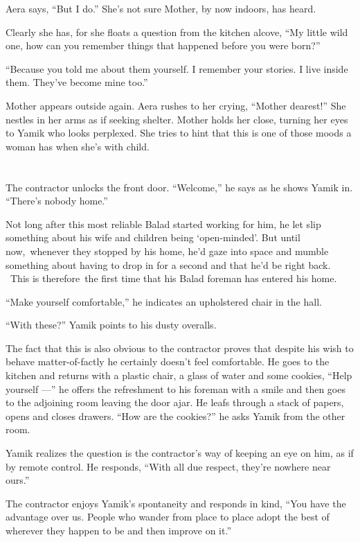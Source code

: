 \documentclass[twoside,11pt,openany]{book}
\begin{document}
Aera says, ``But I do.'' She's not sure Mother, by now indoors, has heard.

Clearly she has, for she floats a question from the kitchen alcove, ``My little wild one, how can you
remember things that happened before you were born?''

``Because you told me about them yourself. I remember your stories. I live inside them. They've become mine
too.''

Mother appears outside again. Aera rushes to her crying, ``Mother dearest!'' She nestles in
her arms as if seeking shelter. Mother holds her close, turning her eyes to Yamik who looks perplexed. She tries to hint
that this is one of those moods a woman has when she's with child.



\chapter{}

The contractor unlocks the front door. ``Welcome,'' he says as he shows Yamik in.
``There's nobody home.''

Not long after this most reliable Balad started working for him, he let slip something about his wife and children
being `open-minded{}'. But until now,~whenever they stopped by his home, he'd gaze into space and mumble something
about having to drop in for a second and that he'd be right back. ~This is therefore~the first time that his Balad
foreman has entered his home.

``Make yourself comfortable,'' he indicates an upholstered chair in the hall.

``With these?'' Yamik points to his dusty overalls.

The fact that this is also obvious to the contractor proves that despite his wish to behave matter-of-factly he certainly
doesn't feel comfortable. He goes to the kitchen and returns with a plastic chair, a glass of water and some cookies,
``Help yourself ---'' he offers the refreshment to his foreman with a smile and then goes to
the adjoining room leaving the door ajar. He leafs through a stack of papers, opens and closes
drawers. ``How are the cookies?'' he asks Yamik from the other room.

Yamik realizes the question is the contractor's way of keeping an eye on him,
as if by remote control. He responds,
``With all due respect, they're nowhere near ours.''

The contractor enjoys Yamik's spontaneity and responds in kind, ``You have the advantage over us. People
who wander from place to place adopt the best of wherever they happen to be and then improve on it.''
\end{document}
